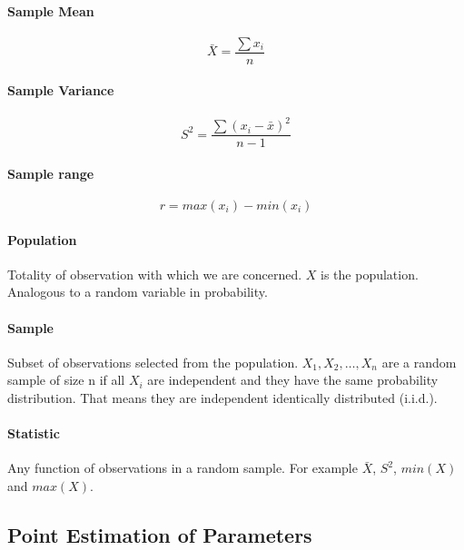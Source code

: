 \documentclass[12pt]{article}
\begin{document}
	\paragraph{Sample Mean}
	
	\begin{equation*}
		\bar{X} = \frac{\sum x_i}{n}
	\end{equation*}
	
	\paragraph{Sample Variance}
	
	\begin{equation*}
		S^2=\frac{\sum (x_i-\bar{x})^2}{n-1}
	\end{equation*}
	
	\paragraph{Sample range}
	
	\begin{equation*}
		r=max(x_i)-min(x_i)
	\end{equation*}
	
	\paragraph{Population}
	
	Totality of observation with which we are concerned. \(X\) is the population. Analogous to a random variable in probability.
	
	\paragraph{Sample}
	
	Subset of observations selected from the population. \(X_1, X_2,\ldots,X_n\) are a random sample of size n if all \(X_i\) are independent and they have the same probability distribution. That means they are independent identically distributed (i.i.d.).
	
	\paragraph{Statistic}
	
	Any function of observations in a random sample. For example \(\bar{X}\), \(S^2\), \(min(X)\) and \(max(X)\).
	
	\subsection{Point Estimation of Parameters}
	
\end{document}
